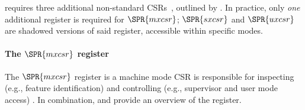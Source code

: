\XCID 
requires three additional
non-standard CSRs~\cite[Section 2]{SCARV:RV:ISA:II:17},
outlined by .
In practice, only {\em one} additional register is required for
$\SPR{mxcsr}$; $\SPR{sxcsr}$ and $\SPR{uxcsr}$ are shadowed versions of said register, accessible
within specific modes.

\paragraph{The $\SPR{mxcsr}$ register}

The
$\SPR{mxcsr}$
register is a machine mode CSR is responsible for
 inspecting (e.g., feature identification)
and 
controlling (e.g., supervisor and user mode access)
\XCID.
In combination,  and  provide an
overview of the register.

